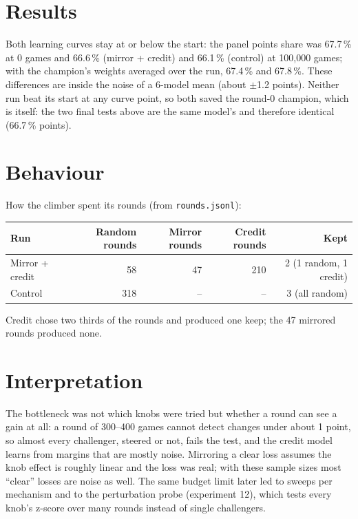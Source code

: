 \documentclass{../polyexp}
\begin{document}
\section{Results}
\ExpResults

Both learning curves stay at or below the start: the panel points share was 67.7\,\% at 0 games and 66.6\,\% (mirror + credit) and 66.1\,\% (control) at 100,000 games; with the champion's weights averaged over the run, 67.4\,\% and 67.8\,\%. These differences are inside the noise of a 6-model mean (about $\pm$1.2 points). Neither run beat its start at any curve point, so both saved the round-0 champion, which is  itself: the two final tests above are the same model's and therefore identical (66.7\,\% points).

\section{Behaviour}
How the climber spent its rounds (from \texttt{rounds.jsonl}):

\begin{center}\sffamily\small\begin{tabular}{@{}lrrrr@{}}\toprule
Run & Random rounds & Mirror rounds & Credit rounds & Kept\\\midrule
Mirror + credit & 58 & 47 & 210 & 2 (1 random, 1 credit)\\
Control & 318 & -- & -- & 3 (all random)\\
\bottomrule\end{tabular}\end{center}

Credit chose two thirds of the rounds and produced one keep; the 47 mirrored rounds produced none.

\section{Interpretation}
The bottleneck was not which knobs were tried but whether a round can see a gain at all: a round of 300--400 games cannot detect changes under about 1 point, so almost every challenger, steered or not, fails the test, and the credit model learns from margins that are mostly noise. Mirroring a clear loss assumes the knob effect is roughly linear and the loss was real; with these sample sizes most ``clear'' losses are noise as well. The same budget limit later led to sweeps per mechanism and to the perturbation probe (experiment 12), which tests every knob's z-score over many rounds instead of single challengers.
\end{document}
